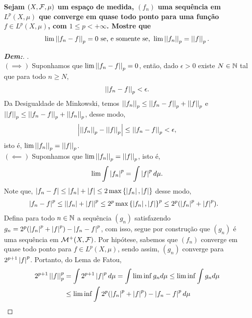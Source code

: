 \textbf{Sejam $(X, \mcal F, \mu)$ um espaço de medida, 
$(f_n)$ uma sequência em $L^p(X, \mu)$ que converge em quase todo ponto 
para uma função $f \in L^p(X, \mu)$, com $1\le p < +\infty$. Mostre que 
\begin{align*}
  \lim \pnorm p {f_n - f} = 0 \text{ se, e somente se, } \lim \pnorm p {f_n} = \pnorm p f.
\end{align*}}
\begin{proof}[\textbf{Dem:}].\\
  $(\implies)$ Suponhamos que $\lim \pnorm p {f_n - f} = 0$, então, 
  dado $\epsilon > 0$ existe $N \in \bN$ tal que para todo $n \ge N$, 
  \begin{align*}
    \pnorm p {f_n - f} < \epsilon.
  \end{align*}
  Da Desigualdade de Minkowski, temos $\pnorm p {f_n} \le \pnorm p {f_n - f} + \pnorm p f$
  e $\pnorm p f \le \pnorm p {f_n - f} + \pnorm p {f_n}$, desse modo, 
  \begin{align*}
    \mparth{\pnorm p {f_n} - \pnorm p f}\le \pnorm p {f_n - f} < \epsilon,
  \end{align*}
  isto é, $\lim \pnorm p {f_n} = \pnorm p f$.\\
  $(\impliedby)$ Suponhamos que $\lim \pnorm p {f_n} = \pnorm p f$, isto é,
  \begin{align*}
    \lim \int \mparth{f_n}^p = \int \mparth{f}^p d\mu.
  \end{align*}  
  Note que, $\mparth{f_n - f} \le \mparth{f_n} + \mparth{f} \le 2\max\set{\mparth{f_n}, \mparth{f}}$
  desse modo, 
  \begin{align*}
    \mparth{f_n - f}^p &\le \mparth{|f_n| + |f|}^p  
    \le 2^p \max\set{\mparth{f_n}, \mparth{f}}^p 
    \le 2^p (\mparth{f_n}^p + \mparth{f}^p).
  \end{align*}
  Defina para todo $n \in \bN$ a sequência $(g_n)$ satisfazendo 
  $g_n = 2^p(\mparth{f_n}^p + \mparth{f}^p) - \mparth{f_n - f}^p$, com isso, segue 
  por construção que $(g_n)$ é uma sequência em $\mcal M^+(X, \mcal F)$. Por hipótese, 
  sabemos que $(f_n)$ converge em quase todo ponto para $f \in L^p(X, \mu)$, sendo assim,
  $(g_n)$ converge para $2^{p+1}\mparth{f}^p$. Portanto, do Lema de Fatou, 
  \begin{align*}
    2^{p+1} \pnorm p f^p&= \int 2^{p+1}\mparth{f}^p d\mu =\int \lim \inf g_n d\mu \le
    \lim \inf \int g_n d\mu \\ 
    &\le \lim \inf \int 2^p(\mparth{f_n}^p + \mparth{f}^p) - \mparth{f_n - f}^p d\mu\\

\end{align*}
\end{proof}
